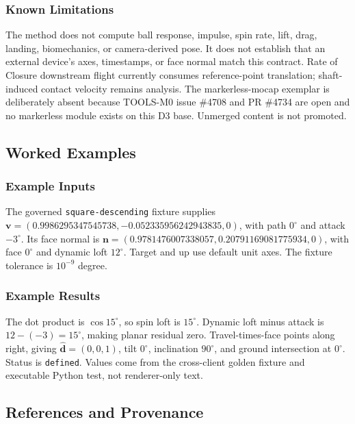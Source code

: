 \documentclass[
  american,
]{article}
\begin{document}
\subsubsection{Known Limitations}\label{known-limitations}

The method does not compute ball response, impulse, spin rate, lift,
drag, landing, biomechanics, or camera-derived pose. It does not
establish that an external device's axes, timestamps, or face normal
match this contract. Rate of Closure downstream flight currently
consumes reference-point translation; shaft-induced contact velocity
remains analysis. The markerless-mocap exemplar is deliberately absent
because TOOLS-M0 issue \#4708 and PR \#4734 are open and no markerless
module exists on this D3 base. Unmerged content is not promoted.

\subsection{Worked Examples}\label{worked-examples}

\subsubsection{Example Inputs}\label{example-inputs}

The governed \texttt{square-descending} fixture supplies
\(\mathbf v=(0.9986295347545738,-0.052335956242943835,0)\), with path
\(0^\circ\) and attack \(-3^\circ\). Its face normal is
\(\mathbf n=(0.9781476007338057,0.20791169081775934,0)\), with face
\(0^\circ\) and dynamic loft \(12^\circ\). Target and up use default
unit axes. The fixture tolerance is \(10^{-9}\) degree.

\subsubsection{Example Results}\label{example-results}

The dot product is \(\cos 15^\circ\), so spin loft is \(15^\circ\).
Dynamic loft minus attack is \(12-(-3)=15^\circ\), making planar
residual zero. Travel-times-face points along right, giving
\(\hat{\mathbf d}=(0,0,1)\), tilt \(0^\circ\), inclination \(90^\circ\),
and ground intersection at \(0^\circ\). Status is \texttt{defined}.
Values come from the cross-client golden fixture and executable Python
test, not renderer-only text.

\subsection{References and Provenance}\label{references-and-provenance}
\end{document}
